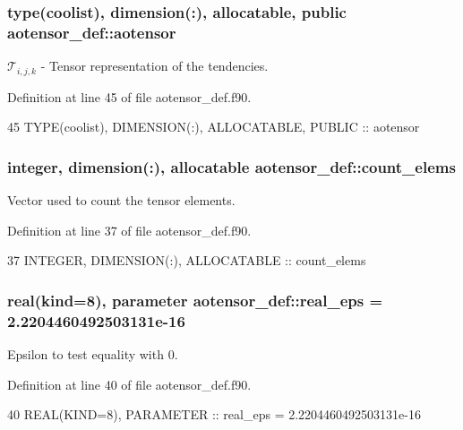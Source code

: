 \subsubsection[{\texorpdfstring{aotensor}{aotensor}}]{\setlength{\rightskip}{0pt plus 5cm}type({\bf coolist}), dimension(\+:), allocatable, public aotensor\+\_\+def\+::aotensor}\hypertarget{namespaceaotensor__def_a0dc43bc9294a18f2fe57b67489f1702f}{}\label{namespaceaotensor__def_a0dc43bc9294a18f2fe57b67489f1702f}


$\mathcal{T}_{i,j,k}$ -\/ Tensor representation of the tendencies. 



Definition at line 45 of file aotensor\+\_\+def.\+f90.


\begin{DoxyCode}
45   \textcolor{keywordtype}{TYPE}(coolist), \textcolor{keywordtype}{DIMENSION(:)}, \textcolor{keywordtype}{ALLOCATABLE}, \textcolor{keywordtype}{PUBLIC} :: aotensor
\end{DoxyCode}
\subsubsection[{\texorpdfstring{count\+\_\+elems}{count_elems}}]{\setlength{\rightskip}{0pt plus 5cm}integer, dimension(\+:), allocatable aotensor\+\_\+def\+::count\+\_\+elems\hspace{0.3cm}{\ttfamily [private]}}\hypertarget{namespaceaotensor__def_aa9e30c84efc5a81409ba9c0286c87eac}{}\label{namespaceaotensor__def_aa9e30c84efc5a81409ba9c0286c87eac}


Vector used to count the tensor elements. 



Definition at line 37 of file aotensor\+\_\+def.\+f90.


\begin{DoxyCode}
37   \textcolor{keywordtype}{INTEGER}, \textcolor{keywordtype}{DIMENSION(:)}, \textcolor{keywordtype}{ALLOCATABLE} :: count\_elems
\end{DoxyCode}
\subsubsection[{\texorpdfstring{real\+\_\+eps}{real_eps}}]{\setlength{\rightskip}{0pt plus 5cm}real(kind=8), parameter aotensor\+\_\+def\+::real\+\_\+eps = 2.\+2204460492503131e-\/16\hspace{0.3cm}{\ttfamily [private]}}\hypertarget{namespaceaotensor__def_ab1cf9313fb1def1a17de539cfa922e35}{}\label{namespaceaotensor__def_ab1cf9313fb1def1a17de539cfa922e35}


Epsilon to test equality with 0. 



Definition at line 40 of file aotensor\+\_\+def.\+f90.


\begin{DoxyCode}
40   \textcolor{keywordtype}{REAL(KIND=8)}, \textcolor{keywordtype}{PARAMETER} :: real\_eps = 2.2204460492503131e-16
\end{DoxyCode}
